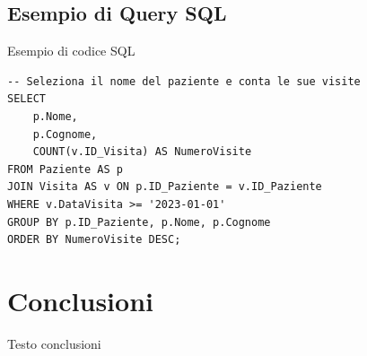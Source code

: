 \documentclass[10pt, a4paper]{article}
\begin{document}
\subsection{Esempio di Query SQL}
Esempio di codice SQL

\begin{lstlisting}[caption={Esempio a caso di riquadro in SQL}, label={}]
-- Seleziona il nome del paziente e conta le sue visite
SELECT
    p.Nome,
    p.Cognome,
    COUNT(v.ID_Visita) AS NumeroVisite
FROM Paziente AS p
JOIN Visita AS v ON p.ID_Paziente = v.ID_Paziente
WHERE v.DataVisita >= '2023-01-01'
GROUP BY p.ID_Paziente, p.Nome, p.Cognome
ORDER BY NumeroVisite DESC;
\end{lstlisting}

\section{Conclusioni}
\label{sec:conclusioni}
Testo conclusioni
\end{document}
